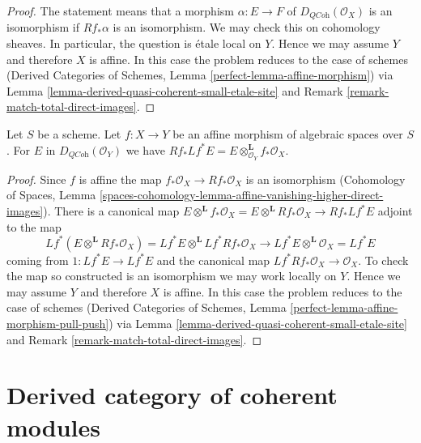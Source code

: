 \begin{proof}
The statement means that a morphism $\alpha : E \to F$ of
$D_{\textit{QCoh}}(\mathcal{O}_X)$ is an isomorphism if
$Rf_*\alpha$ is an isomorphism. We may check this on cohomology sheaves.
In particular, the question is \'etale local on $Y$. Hence we may assume
$Y$ and therefore $X$ is affine. In this case the problem reduces to the
case of schemes
(Derived Categories of Schemes, Lemma \ref{perfect-lemma-affine-morphism})
via Lemma \ref{lemma-derived-quasi-coherent-small-etale-site} and
Remark \ref{remark-match-total-direct-images}.
\end{proof}

\begin{lemma}
\label{lemma-affine-morphism-pull-push}
Let $S$ be a scheme. Let $f : X \to Y$ be an affine morphism of algebraic
spaces over $S$. For $E$ in $D_{\textit{QCoh}}(\mathcal{O}_Y)$ we have
$Rf_* Lf^* E = E \otimes^\mathbf{L}_{\mathcal{O}_Y} f_*\mathcal{O}_X$.
\end{lemma}

\begin{proof}
Since $f$ is affine the map $f_*\mathcal{O}_X \to Rf_*\mathcal{O}_X$
is an isomorphism (Cohomology of Spaces, Lemma
\ref{spaces-cohomology-lemma-affine-vanishing-higher-direct-images}).
There is a canonical map
$E \otimes^\mathbf{L} f_*\mathcal{O}_X =
E \otimes^\mathbf{L} Rf_*\mathcal{O}_X \to Rf_* Lf^* E$
adjoint to the map
$$
Lf^*(E \otimes^\mathbf{L} Rf_*\mathcal{O}_X) =
Lf^*E \otimes^\mathbf{L} Lf^*Rf_*\mathcal{O}_X \longrightarrow
Lf^* E \otimes^\mathbf{L} \mathcal{O}_X = Lf^* E
$$
coming from $1 : Lf^*E \to Lf^*E$ and the canonical map
$Lf^*Rf_*\mathcal{O}_X \to \mathcal{O}_X$. To check the map so constructed
is an isomorphism we may work locally on $Y$. Hence we may assume
$Y$ and therefore $X$ is affine. In this case the problem reduces to the
case of schemes
(Derived Categories of Schemes, Lemma
\ref{perfect-lemma-affine-morphism-pull-push})
via Lemma \ref{lemma-derived-quasi-coherent-small-etale-site} and
Remark \ref{remark-match-total-direct-images}.
\end{proof}






\section{Derived category of coherent modules}
\label{section-derived-coherent}

